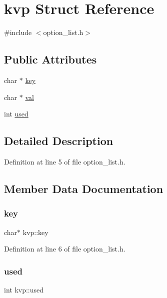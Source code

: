 \hypertarget{structkvp}{}\section{kvp Struct Reference}
\label{structkvp}


{\ttfamily \#include $<$option\+\_\+list.\+h$>$}

\subsection*{Public Attributes}
\begin{DoxyCompactItemize}
\item 
char $\ast$ \mbox{\hyperlink{structkvp_ada553aa3459987ea43b7219868ba0a8f}{key}}
\item 
char $\ast$ \mbox{\hyperlink{structkvp_acfabb2665bc533f70cce1d708b6e6053}{val}}
\item 
int \mbox{\hyperlink{structkvp_a655effdf8a3be7aca94fe4f199f026fb}{used}}
\end{DoxyCompactItemize}


\subsection{Detailed Description}


Definition at line 5 of file option\+\_\+list.\+h.



\subsection{Member Data Documentation}
\mbox{\label{structkvp_ada553aa3459987ea43b7219868ba0a8f}} 
\subsubsection{\texorpdfstring{key}{key}}
{\footnotesize\ttfamily char$\ast$ kvp\+::key}



Definition at line 6 of file option\+\_\+list.\+h.

\mbox{\label{structkvp_a655effdf8a3be7aca94fe4f199f026fb}} 
\subsubsection{\texorpdfstring{used}{used}}
{\footnotesize\ttfamily int kvp\+::used}




